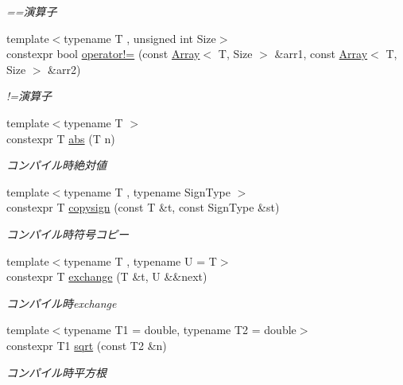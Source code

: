 \begin{DoxyCompactItemize}
\begin{DoxyCompactList}\small\item\em ==演算子 \end{DoxyCompactList}\item 
{\footnotesize template$<$typename T , unsigned int Size$>$ }\\constexpr bool \mbox{\hyperlink{namespacesaki_a08cb75d91d73dcb809caa1e06507ce37}{operator!=}} (const \mbox{\hyperlink{classsaki_1_1_array}{Array}}$<$ T, Size $>$ \&arr1, const \mbox{\hyperlink{classsaki_1_1_array}{Array}}$<$ T, Size $>$ \&arr2)
\begin{DoxyCompactList}\small\item\em !=演算子 \end{DoxyCompactList}\item 
{\footnotesize template$<$typename T $>$ }\\constexpr T \mbox{\hyperlink{namespacesaki_a012046e05c5909bb34ca3e609ca74ff3}{abs}} (T n)
\begin{DoxyCompactList}\small\item\em コンパイル時絶対値 \end{DoxyCompactList}\item 
{\footnotesize template$<$typename T , typename Sign\+Type $>$ }\\constexpr T \mbox{\hyperlink{namespacesaki_a1791113a346dea4c2d7fd8e120016038}{copysign}} (const T \&t, const Sign\+Type \&st)
\begin{DoxyCompactList}\small\item\em コンパイル時符号コピー \end{DoxyCompactList}\item 
{\footnotesize template$<$typename T , typename U  = T$>$ }\\constexpr T \mbox{\hyperlink{namespacesaki_a41390f371e093d85f55a61f26277c185}{exchange}} (T \&t, U \&\&next)
\begin{DoxyCompactList}\small\item\em コンパイル時exchange \end{DoxyCompactList}\item 
{\footnotesize template$<$typename T1  = double, typename T2  = double$>$ }\\constexpr T1 \mbox{\hyperlink{namespacesaki_a1059e80b300067041c754c1686b04dbd}{sqrt}} (const T2 \&n)
\begin{DoxyCompactList}\small\item\em コンパイル時平方根 \end{DoxyCompactList}\item 

\end{DoxyCompactItemize}
